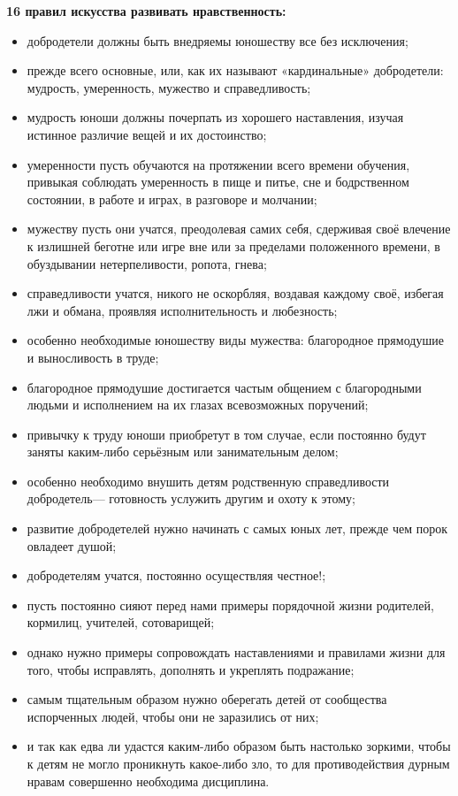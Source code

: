 \documentclass[12pt]{article}			%
\begin{document}
	
	{\bf16 правил искусства развивать нравственность:}
	\begin{itemize}
		\item добродетели должны быть внедряемы юношеству все без исключения;
		\item прежде всего основные, или, как их называют «кардинальные» добродетели: мудрость, умеренность, мужество и справедливость;
		\item мудрость юноши должны почерпать из хорошего наставления, изучая истинное различие вещей и их достоинство;
		\item умеренности пусть обучаются на протяжении всего времени обучения, привыкая соблюдать умеренность в пище и питье, сне и бодрственном состоянии, в работе и играх, в разговоре и молчании;
		\item мужеству пусть они учатся, преодолевая самих себя, сдерживая своё влечение к излишней беготне или игре вне или за пределами положенного времени, в обуздывании нетерпеливости, ропота, гнева;
		\item справедливости учатся, никого не оскорбляя, воздавая каждому своё, избегая лжи и обмана, проявляя исполнительность и любезность;
		\item особенно необходимые юношеству виды мужества: благородное прямодушие и выносливость в труде;
		\item благородное прямодушие достигается частым общением с благородными людьми и исполнением на их глазах всевозможных поручений;
		\item привычку к труду юноши приобретут в том случае, если постоянно будут заняты каким-либо серьёзным или занимательным делом;
		\item особенно необходимо внушить детям родственную справедливости добродетель— готовность услужить другим и охоту к этому;
		\item развитие добродетелей нужно начинать с самых юных лет, прежде чем порок овладеет душой;
		\item добродетелям учатся, постоянно осуществляя честное!;
		\item пусть постоянно сияют перед нами примеры порядочной жизни родителей, кормилиц, учителей, сотоварищей;
		\item однако нужно примеры сопровождать наставлениями и правилами жизни для того, чтобы исправлять, дополнять и укреплять подражание;
		\item самым тщательным образом нужно оберегать детей от сообщества испорченных людей, чтобы они не заразились от них;
		\item и так как едва ли удастся каким-либо образом быть настолько зоркими, чтобы к детям не могло проникнуть какое-либо зло, то для противодействия дурным нравам совершенно необходима дисциплина.
	\end{itemize}
	
\end{document}
